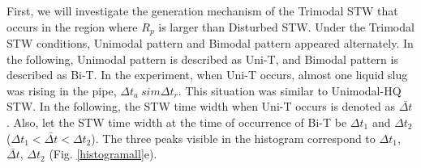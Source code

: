 \documentclass[aps,pre,preprint,groupedaddress,showkeys]{revtex4-2}
\begin{document}
First, we will investigate the generation mechanism of the Trimodal STW that occurs in the region where $ R_p $ is larger than Disturbed STW.
Under the Trimodal STW conditions, Unimodal pattern and Bimodal pattern appeared alternately.
In the following, Unimodal pattern is described as Uni-T, and Bimodal pattern is described as Bi-T.
In the experiment, when Uni-T occurs, almost one liquid slug was rising in the pipe, $ \Delta t_a \ sim \Delta t_r $.
This situation was similar to Unimodal-HQ STW.
In the following, the STW time width when Uni-T occurs is denoted as $ \bar {\Delta t} $.
Also, let the STW time width at the time of occurrence of Bi-T be $ \Delta t_1 $ and $ \Delta t_2 $ ($ \Delta t_1 <\bar {\Delta t} <\Delta t_2 $).
The three peaks visible in the histogram correspond to $ \Delta t_1 $, $ \bar {\Delta t} $, $ \Delta t_2 $ (Fig. \ref{histogramall}e).
\end{document}
